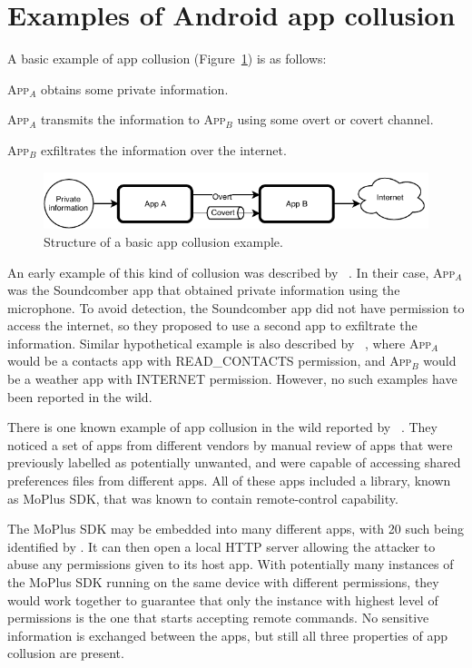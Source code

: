 \documentclass[article, oneside]{aaltoseries}
\newcommand{\Fref}[1]{Figure~\ref{#1}}
\newcommand{\app}[1]{A\textsc{pp}$_{#1}$\xspace}
\begin{document}
\section{Examples of Android app collusion}
\label{sec:examples}

A basic example of app collusion (\Fref{fig:sample}) is as follows:
\begin{singleenums}
	\item \app{A} obtains some private information.
	\item \app{A} transmits the information to \app{B} using some overt or covert channel.
	\item \app{B} exfiltrates the information over the internet.
\end{singleenums}

\begin{figure}[h]
	\centering
	\includegraphics[width=1.0\textwidth]{figures/Collusion1}
	\caption{Structure of a basic app collusion example.}
	\label{fig:sample}
\end{figure}

An early example of this kind of collusion was described by \citeauthor{Schlegel2011}~\cite{Schlegel2011}. In their case, \app{A} was the Soundcomber app that obtained private information using the microphone. To avoid detection, the Soundcomber app did not have permission to access the internet, so they proposed to use a second app to exfiltrate the information. Similar hypothetical example is also described by \citeauthor{Asavoae2017}~\cite{Asavoae2017}, where \app{A} would be a contacts app with READ\_CONTACTS permission, and \app{B} would be a weather app with INTERNET permission. However, no such examples have been reported in the wild.

There is one known example of app collusion in the wild reported by \citeauthor{Blasco2016}~\cite{Blasco2016}. They noticed a set of apps from different vendors by manual review of apps that were previously labelled as potentially unwanted, and were capable of accessing shared preferences files from different apps. All of these apps included a library, known as MoPlus SDK, that was known to contain remote-control capability.

The MoPlus SDK may be embedded into many different apps, with 20 such being identified by \cite{Blasco2016}. It can then open a local HTTP server allowing the attacker to abuse any permissions given to its host app. With potentially many instances of the MoPlus SDK running on the same device with different permissions, they would work together to guarantee that only the instance with highest level of permissions is the one that starts accepting remote commands. No sensitive information is exchanged between the apps, but still all three properties of app collusion are present.
\end{document}
